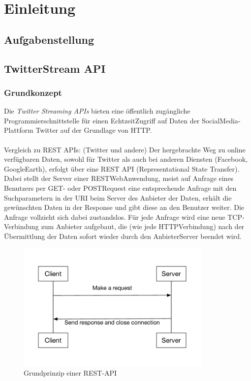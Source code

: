 \chapter{Einleitung}

\section{Aufgabenstellung}
\section{TwitterStream API}
\subsection{Grundkonzept}

Die \textit{Twitter Streaming APIs} bieten eine öffentlich zugängliche Programmierschnittstelle für einen Echtzeit­Zugriff auf Daten der Social­Media­Plattform Twitter auf der Grundlage von HTTP.
\\\\
Vergleich zu REST APIs: (Twitter und andere)
Der hergebrachte Weg zu online verfügbaren Daten, sowohl für Twitter als auch bei anderen
Diensten (Facebook, GoogleEarth), erfolgt über eine REST API (Representational State Transfer).
Dabei stellt der Server einer REST­Web­Anwendung, meist auf Anfrage eines Benutzers per GET-
oder POST­Request eine entsprechende Anfrage mit den Suchparametern in der URI beim Server
des Anbieter der Daten, erhält die gewünschten Daten in der Response und gibt diese an den
Benutzer weiter. Die Anfrage vollzieht sich dabei zustandslos. Für jede Anfrage wird eine neue
TCP­Verbindung zum Anbieter aufgebaut, die (wie jede HTTP­Verbindung) nach der
Übermittlung der Daten sofort wieder durch den Anbieter­Server beendet wird. \\

\begin{figure}
    \centering
    \includegraphics[width=0.85\textwidth]{Graphics/normal_rest_api}
    \caption{Grundprinzip einer REST-API}
   \label{fig:restapi}
\end{figure}

